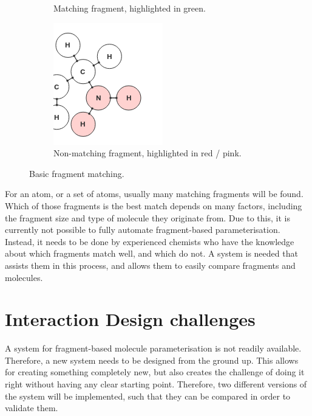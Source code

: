\begin{figure}[h!]
\begin{subfigure}[t]{0.29\textwidth}
\caption{Matching fragment, highlighted in green.}
\end{subfigure}%
\qquad
\begin{subfigure}[t]{0.29\textwidth}
\centering
\includegraphics[width=\textwidth]{img/match_3.png}
\caption{Non-matching fragment, highlighted in red / pink.}
\end{subfigure}
\caption{Basic fragment matching.}
\end{figure}

For an atom, or a set of atoms, usually many matching fragments will be found. Which of those fragments is the best match depends on many factors, including the fragment size and type of molecule they originate from. Due to this, it is currently not possible to fully automate fragment-based parameterisation. Instead, it needs to be done by experienced chemists who have the knowledge about which fragments match well, and which do not. A system is needed that assists them in this process, and allows them to easily compare fragments and molecules.


\section{Interaction Design challenges}
A system for fragment-based molecule parameterisation is not readily available. Therefore, a new system needs to be designed from the ground up. This allows for creating something completely new, but also creates the challenge of doing it right without having any clear starting point. Therefore, two different versions of the system will be implemented, such that they can be compared in order to validate them.

